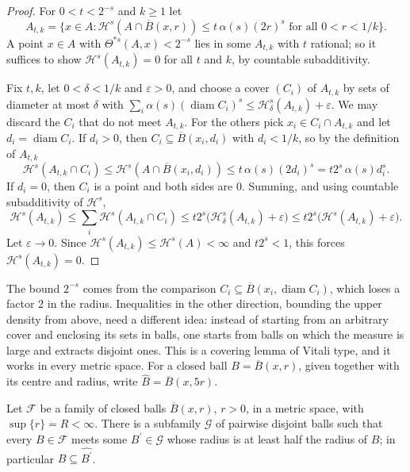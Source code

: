 \begin{proof}
For $0 < t < 2^{-s}$ and $k \geq 1$ let
\[
A_{t, k} = \bigl\{x \in A : \mathcal{H}^s(A \cap \overline{B}(x, r)) \leq t\,\alpha(s)(2r)^s \text{ for all } 0 < r < 1/k\bigr\}.
\]
A point $x \in A$ with $\Theta^{*s}(A, x) < 2^{-s}$ lies in some $A_{t, k}$ with $t$ rational; so it suffices to show $\mathcal{H}^s(A_{t, k}) = 0$ for all $t$ and $k$, by countable subadditivity.

Fix $t, k$, let $0 < \delta < 1/k$ and $\varepsilon > 0$, and choose a cover $(C_i)$ of $A_{t, k}$ by sets of diameter at most $\delta$ with
$\sum_i\alpha(s)(\operatorname{diam}C_i)^s \leq \mathcal{H}^s_\delta(A_{t, k}) + \varepsilon$. We may discard the $C_i$ that do not meet $A_{t, k}$. For the others pick $x_i \in C_i \cap A_{t, k}$ and let
$d_i = \operatorname{diam}C_i$. If $d_i > 0$, then $C_i \subseteq \overline{B}(x_i, d_i)$ with $d_i < 1/k$, so by the definition of $A_{t, k}$
\[
\mathcal{H}^s(A_{t, k} \cap C_i) \leq \mathcal{H}^s(A \cap \overline{B}(x_i, d_i)) \leq t\,\alpha(s)(2d_i)^s = t2^s\,\alpha(s)d_i^s .
\]
If $d_i = 0$, then $C_i$ is a point and both sides are $0$. Summing, and using countable subadditivity of $\mathcal{H}^s$,
\[
\mathcal{H}^s(A_{t, k}) \leq \sum_i\mathcal{H}^s(A_{t, k} \cap C_i) \leq t2^s\bigl(\mathcal{H}^s_\delta(A_{t, k}) + \varepsilon\bigr) \leq t2^s\bigl(\mathcal{H}^s(A_{t, k}) + \varepsilon\bigr).
\]
Let $\varepsilon \to 0$. Since $\mathcal{H}^s(A_{t, k}) \leq \mathcal{H}^s(A) < \infty$ and $t2^s < 1$, this forces $\mathcal{H}^s(A_{t, k}) = 0$.
\end{proof}

The bound $2^{-s}$ comes from the comparison $C_i \subseteq \overline{B}(x_i, \operatorname{diam}C_i)$, which loses a factor $2$ in the radius. Inequalities in the other direction, bounding the
upper density from above, need a different idea: instead of starting from an arbitrary cover and enclosing its sets in balls, one starts from balls on which the measure is large and extracts disjoint
ones. This is a covering lemma of Vitali type, and it works in every metric space. For a closed ball $B = \overline{B}(x, r)$, given together with its centre and radius, write $\widehat{B} = \overline{B}(x, 5r)$.

\begin{lemma}\label{measure-theory:lemma-five-r-covering}
Let $\mathcal{F}$ be a family of closed balls $\overline{B}(x, r)$, $r > 0$, in a metric space, with $\sup\{r\} = R < \infty$. There is a subfamily $\mathcal{G}$ of pairwise disjoint balls such that every
$B \in \mathcal{F}$ meets some $B^{\prime} \in \mathcal{G}$ whose radius is at least half the radius of $B$; in particular $B \subseteq \widehat{B^{\prime}}$.
\end{lemma}

